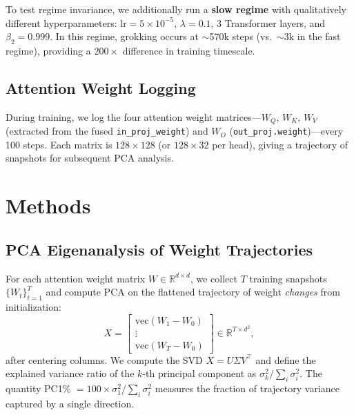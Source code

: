 \documentclass[11pt]{article}
\newcommand{\R}{\mathbb{R}}
\begin{document}
To test regime invariance, we additionally run a \textbf{slow regime} with qualitatively different hyperparameters: $\mathrm{lr} = 5 \times 10^{-5}$, $\lambda = 0.1$, 3 Transformer layers, and $\beta_2 = 0.999$.
In this regime, grokking occurs at $\sim$570k steps (vs.\ $\sim$3k in the fast regime), providing a $200\times$ difference in training timescale.

\subsection{Attention Weight Logging}

During training, we log the four attention weight matrices---$W_Q$, $W_K$, $W_V$ (extracted from the fused \texttt{in\_proj\_weight}) and $W_O$ (\texttt{out\_proj.weight})---every 100 steps.
Each matrix is $128 \times 128$ (or $128 \times 32$ per head), giving a trajectory of snapshots for subsequent PCA analysis.


\section{Methods}
\label{sec:methods}

\subsection{PCA Eigenanalysis of Weight Trajectories}
\label{sec:pca}

For each attention weight matrix $W \in \R^{d \times d}$, we collect $T$ training snapshots $\{W_t\}_{t=1}^T$ and compute PCA on the flattened trajectory of weight \emph{changes} from initialization:
\begin{equation}
    X = \begin{bmatrix} \mathrm{vec}(W_1 - W_0) \\ \vdots \\ \mathrm{vec}(W_T - W_0) \end{bmatrix} \in \R^{T \times d^2},
\end{equation}
after centering columns.
We compute the SVD $X = U \Sigma V^\top$ and define the explained variance ratio of the $k$-th principal component as $\sigma_k^2 / \sum_i \sigma_i^2$.
The quantity PC1\% $= 100 \times \sigma_1^2 / \sum_i \sigma_i^2$ measures the fraction of trajectory variance captured by a single direction.
\end{document}
